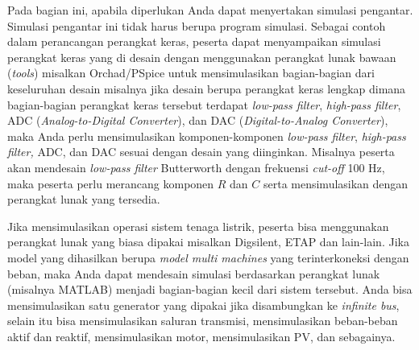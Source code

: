 Pada bagian ini, apabila diperlukan Anda dapat menyertakan simulasi pengantar. Simulasi pengantar ini tidak harus berupa program simulasi. Sebagai contoh dalam perancangan perangkat keras, peserta dapat menyampaikan simulasi perangkat keras yang di desain dengan menggunakan perangkat lunak bawaan (\textit{tools}) misalkan Orchad/PSpice untuk mensimulasikan bagian-bagian dari keseluruhan desain misalnya jika desain berupa perangkat keras lengkap dimana bagian-bagian perangkat keras tersebut terdapat \textit{low-pass filter}, \textit{high-pass filter}, ADC (\textit{Analog-to-Digital Converter}), dan DAC (\textit{Digital-to-Analog Converter}), maka Anda perlu mensimulasikan komponen-komponen \textit{low-pass filter},\textit{ high-pass filter,} ADC, dan DAC sesuai dengan desain yang diinginkan. Misalnya peserta akan mendesain \textit{low-pass filter} Butterworth dengan frekuensi \textit{cut-off} 100 Hz, maka peserta perlu merancang komponen $R$ dan $C$ serta mensimulasikan dengan perangkat lunak yang tersedia.

Jika mensimulasikan operasi sistem tenaga listrik, peserta bisa menggunakan perangkat lunak yang biasa dipakai misalkan Digsilent, ETAP dan lain-lain. Jika model yang dihasilkan berupa \textit{model multi machines} yang terinterkoneksi dengan beban, maka Anda dapat mendesain simulasi berdasarkan perangkat lunak (misalnya MATLAB) menjadi bagian-bagian kecil dari sistem tersebut. Anda bisa mensimulasikan satu generator yang dipakai jika disambungkan ke \textit{infinite bus}, selain itu bisa mensimulasikan saluran transmisi, mensimulasikan beban-beban aktif dan reaktif, mensimulasikan motor, mensimulasikan PV, dan sebagainya.
